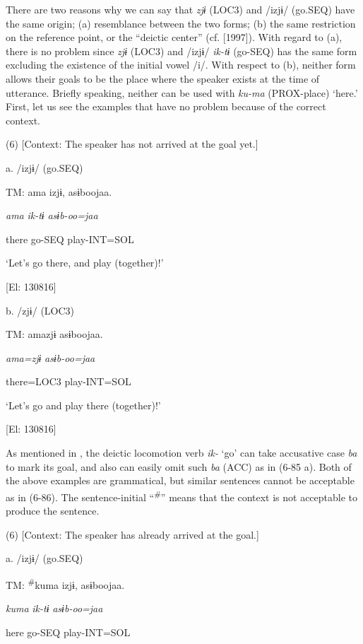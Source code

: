 There are two reasons why we can say that \textit{zjɨ} (LOC3) and /izjɨ/ (go.SEQ) have the same origin; (a) resemblance between the two forms; (b) the same restriction on the reference point, or the “deictic center” (cf. \citealt{Fillmore1971} [1997]). With regard to (a), there is no problem since \textit{zjɨ} (LOC3) and /izjɨ/ \textit{ik-tɨ} (go-SEQ) has the same form excluding the existence of the initial vowel /i/. With respect to (b), neither form allows their goals to be the place where the speaker exists at the time of utterance. Briefly speaking, neither can be used with \textit{ku-ma} (PROX-place) ‘here.’ First, let us see the examples that have no problem because of the correct context.

(6)  [Context: The speaker has not arrived at the goal yet.]

  a.  /izjɨ/ (go.SEQ)

    TM:  ama  izjɨ,  asɨboojaa.

      \textit{ama}  \textit{ik-tɨ}  \textit{asɨb-oo=jaa}

      there  go-SEQ  play-INT=SOL

      ‘Let’s go there, and play (together)!’

    [El: 130816]

  b.  /zjɨ/ (LOC3)

    TM:  amazjɨ  asɨboojaa.

      \textit{ama=zjɨ}  \textit{asɨb-oo=jaa}

      there=LOC3  play-INT=SOL

      ‘Let’s go and play there (together)!’

    [El: 130816]

As mentioned in , the deictic locomotion verb \textit{ik-} ‘go’ can take accusative case \textit{ba} to mark its goal, and also can easily omit such \textit{ba} (ACC) as in (6-85 a). Both of the above examples are grammatical, but similar sentences cannot be acceptable as in (6-86). The sentence-initial “\textsuperscript{\#}” means that the context is not acceptable to produce the sentence.

(6)  [Context: The speaker has already arrived at the goal.]

  a.  /izjɨ/ (go.SEQ)

    TM:  \textsuperscript{\#}kuma  izjɨ,  asɨboojaa.

      \textit{kuma}  \textit{ik-tɨ}  \textit{asɨb-oo=jaa}

      here  go-SEQ  play-INT=SOL

